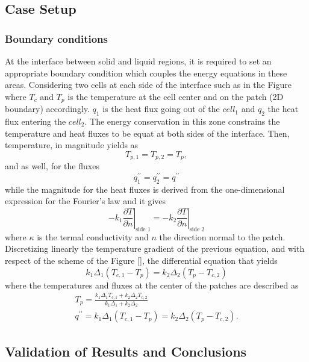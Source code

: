 \subsection{Case Setup}
\subsubsection{Boundary conditions}
At the interface between solid and liquid regions, it is required to set an appropriate boundary condition which couples the energy equations in these areas.
\newline
Considering two cells at each side of the interface such as in the Figure
\newline
where $T_c$ and $T_p$ is the temperature at the cell center and on the patch (2D boundary) accordingly. $q_1$ is the heat flux going out of the $cell_1$ and $q_2$ the heat flux entering the $cell_2$. The energy conservation in this zone constrains the temperature and heat fluxes to be equat at both sides of the interface. 
Then, temperature, in magnitude yields as
\begin{equation}
	T_{p, 1}=T_{p, 2}=T_{p},
\end{equation}
and as well, for the fluxes
\begin{equation}
q_{1}^{\prime \prime}=q_{2}^{\prime \prime}=q^{\prime \prime}
\end{equation}
while the magnitude for the heat fluxes is derived from the one-dimensional expression for the Fourier's law and it gives
\begin{equation}
-\left.k_{1} \frac{\partial T}{\partial n}\right|_{\text {side } 1}=-\left.k_{2} \frac{\partial T}{\partial n}\right|_{\text {side } 2}
\end{equation}
where $\kappa$ is the termal conductivity and $n$ the direction normal to the patch.
Discretizing linearly the temperature gradient of the previous equation, and with respect of the scheme of the Figure [], the differential equation that yields 
\begin{equation}
k_{1} \Delta_{1}\left(T_{c, 1}-T_{p}\right)=k_{2} \Delta_{2}\left(T_{p}-T_{c, 2}\right)
\end{equation}
where the temperatures and fluxes at the center of the patches are described as
\begin{equation}
\begin{gathered}
T_{p}=\frac{k_{1} \Delta_{1} T_{c, 1}+k_{2} \Delta_{2} T_{c, 2}}{k_{1} \Delta_{1}+k_{2} \Delta_{2}} \\
q^{\prime \prime}=k_{1} \Delta_{1}\left(T_{c, 1}-T_{p}\right)=k_{2} \Delta_{2}\left(T_{p}-T_{c, 2}\right) .
\end{gathered}
\end{equation}
\subsection{Validation of Results and Conclusions}

